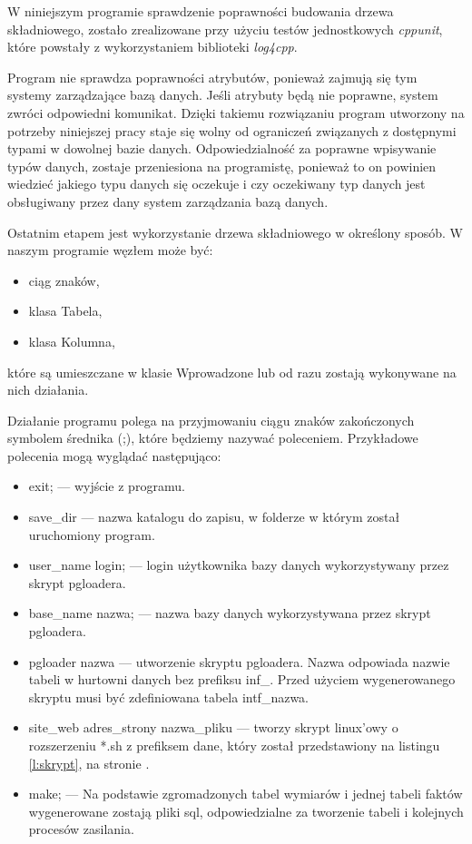 W niniejszym programie sprawdzenie poprawności budowania drzewa składniowego,
 zostało zrealizowane przy użyciu testów jednostkowych \textit{cppunit}, 
 które powstały z wykorzystaniem biblioteki \textit{log4cpp}.

Program nie sprawdza poprawności atrybutów,
 ponieważ zajmują się tym systemy zarządzające bazą danych. 
Jeśli atrybuty będą nie poprawne,
 system zwróci odpowiedni komunikat. 
Dzięki takiemu rozwiązaniu program utworzony na potrzeby niniejszej pracy
 staje się wolny od ograniczeń związanych z dostępnymi typami w dowolnej bazie danych.
Odpowiedzialność za poprawne wpisywanie typów danych, zostaje przeniesiona na programistę,
 ponieważ to on powinien wiedzieć jakiego typu danych się oczekuje 
 i czy oczekiwany typ danych jest obsługiwany przez dany system zarządzania bazą danych.

Ostatnim etapem jest wykorzystanie drzewa składniowego w określony sposób. W naszym programie węzłem może być:

 \begin{itemize}
  \item ciąg znaków,
  \item klasa Tabela,
  \item klasa Kolumna,
 \end{itemize}
które są umieszczane w klasie Wprowadzone lub od razu zostają wykonywane na nich działania.

Działanie programu polega na przyjmowaniu ciągu znaków zakończonych symbolem średnika (;), które będziemy nazywać poleceniem.
Przykładowe polecenia mogą wyglądać następująco:

\begin{itemize}
 \item exit; --- 
    wyjście z programu.
 \item save\_dir --- 
    nazwa katalogu do zapisu, w folderze w którym został uruchomiony program.
 \item user\_name login;  ---
    login użytkownika bazy danych wykorzystywany przez skrypt pgloadera.
 \item base\_name nazwa; ---
    nazwa bazy danych wykorzystywana przez skrypt pgloadera.
 \item pgloader nazwa --- 
    utworzenie skryptu pgloadera. Nazwa odpowiada nazwie tabeli w hurtowni danych bez prefiksu inf\_. Przed użyciem wygenerowanego skryptu musi być zdefiniowana tabela intf\_nazwa.
 \item site\_web adres\_strony nazwa\_pliku ---
    tworzy skrypt linux'owy o rozszerzeniu *.sh z prefiksem dane, który został przedstawiony na listingu \ref{l:skrypt}, na stronie \pageref{l:skrypt}.
 \item make; ---
   Na podstawie zgromadzonych tabel wymiarów i jednej tabeli faktów wygenerowane zostają pliki sql, odpowiedzialne za tworzenie tabeli i kolejnych procesów zasilania.
\end{itemize}

